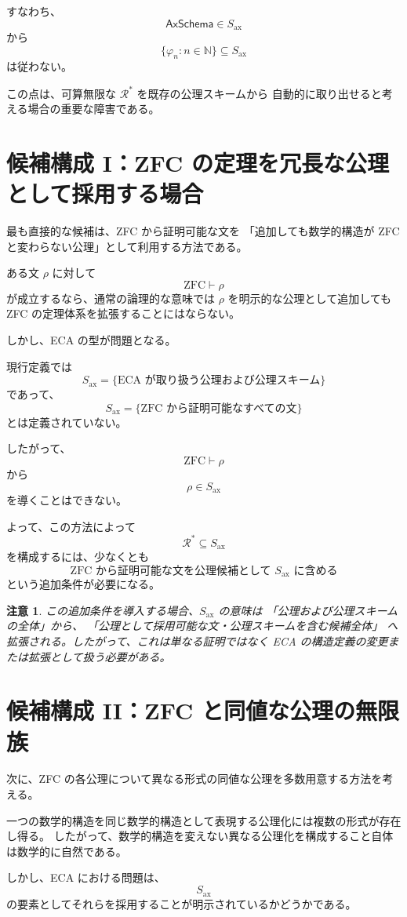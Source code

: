 \documentclass[a4paper,11pt]{article}
\newtheorem{remark}[definition]{注意}
\newcommand{\Ax}{S_{\mathrm{ax}}}
\begin{document}
すなわち、
\[
\mathsf{AxSchema}\in\Ax
\]
から
\[
\{\varphi_n:n\in\mathbb{N}\}\subseteq\Ax
\]
は従わない。

この点は、可算無限な $\mathcal{R}^{*}$ を既存の公理スキームから
自動的に取り出せると考える場合の重要な障害である。

\section{候補構成 I：ZFC の定理を冗長な公理として採用する場合}

最も直接的な候補は、ZFC から証明可能な文を
「追加しても数学的構造が ZFC と変わらない公理」として利用する方法である。

ある文 $\rho$ に対して
\[
\mathrm{ZFC}\vdash\rho
\]
が成立するなら、通常の論理的な意味では
$\rho$ を明示的な公理として追加しても ZFC の定理体系を拡張することにはならない。

しかし、ECA の型が問題となる。

現行定義では
\[
\Ax
=
\{\text{ECA が取り扱う公理および公理スキーム}\}
\]
であって、
\[
\Ax
=
\{\text{ZFC から証明可能なすべての文}\}
\]
とは定義されていない。

したがって、
\[
\mathrm{ZFC}\vdash\rho
\]
から
\[
\rho\in\Ax
\]
を導くことはできない。

よって、この方法によって
\[
\mathcal{R}^{*}\subseteq\Ax
\]
を構成するには、少なくとも
\[
\boxed{
\text{ZFC から証明可能な文を公理候補として $\Ax$ に含める}
}
\]
という追加条件が必要になる。

\begin{remark}
この追加条件を導入する場合、$\Ax$ の意味は
「公理および公理スキームの全体」から、
「公理として採用可能な文・公理スキームを含む候補全体」
へ拡張される。したがって、これは単なる証明ではなく
ECA の構造定義の変更または拡張として扱う必要がある。
\end{remark}

\section{候補構成 II：ZFC と同値な公理の無限族}

次に、ZFC の各公理について異なる形式の同値な公理を多数用意する方法を考える。

一つの数学的構造を同じ数学的構造として表現する公理化には複数の形式が存在し得る。
したがって、数学的構造を変えない異なる公理化を構成すること自体は数学的に自然である。

しかし、ECA における問題は、
\[
\Ax
\]
の要素としてそれらを採用することが明示されているかどうかである。
\end{document}
